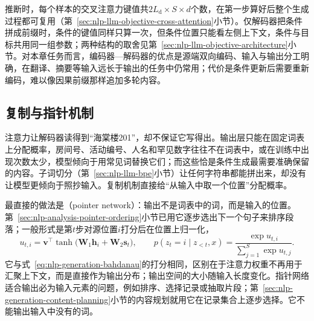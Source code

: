 推断时，每个样本的交叉注意力键值共$2L_{\mathrm d}\times S\times d$个数，在第一步算好后整个生成过程都可复用（第~\ref{sec:nlp-llm-objective-cross-attention}小节）。仅解码器把条件拼成前缀时，条件的键值同样只算一次，但条件位置只能看左侧上下文，条件与目标共用同一组参数；两种结构的取舍见第~\ref{sec:nlp-llm-objective-architecture}小节。对本章任务而言，编码器—解码器的优点是源端双向编码、输入与输出分工明确，在翻译、摘要等输入远长于输出的任务中仍常用；代价是条件更新后需要重新编码，难以像因果前缀那样追加多轮内容。

\subsection{复制与指针机制}
\label{sec:nlp-generation-copy-pointer}

注意力让解码器读得到“海棠楼201”，却不保证它写得出。输出层只能在固定词表上分配概率，房间号、活动编号、人名和罕见数字往往不在词表中，或在训练中出现次数太少，模型倾向于用常见词替换它们；而这些恰是条件生成最需要准确保留的内容。子词切分（第~\ref{sec:nlp-llm-bpe}小节）让任何字符串都能拼出来，却没有让模型更倾向于照抄输入。复制机制直接给“从输入中取一个位置”分配概率。

最直接的做法是（pointer network）：输出不是词表中的词，而是输入的位置。第~\ref{sec:nlp-analysis-pointer-ordering}小节已用它逐步选出下一个句子来排序段落；一般形式是第$t$步对源位置$i$打分后在位置上归一化，
\begin{equation}
  u_{t,i}=\bm v^{\top}\tanh\bigl(\bm W_1\bm h_i+\bm W_2\bm s_t\bigr),\qquad
  p(z_t=i\mid z_{<t},x)=\frac{\exp u_{t,i}}{\sum_{j=1}^{S}\exp u_{t,j}} .
  \label{eq:nlp-generation-pointer-network}
\end{equation}
它与式~\eqref{eq:nlp-generation-bahdanau}的打分相同，区别在于注意力权重不再用于汇聚上下文，而是直接作为输出分布；输出空间的大小随输入长度变化。指针网络适合输出必为输入元素的问题，例如排序、选择记录或抽取片段；第~\ref{sec:nlp-generation-content-planning}小节的内容规划就用它在记录集合上逐步选择。它不能输出输入中没有的词。


